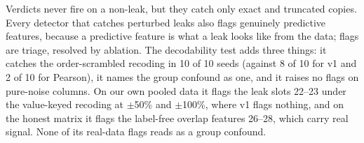 \documentclass{article}
\begin{document}
Verdicts never fire on a non-leak, but they catch only exact and truncated copies. Every detector
that catches perturbed leaks also flags genuinely predictive features, because a predictive
feature is what a leak looks like from the data; flags are triage, resolved by ablation. The
decodability test adds three things: it catches the order-scrambled recoding in 10 of 10 seeds
(against 8 of 10 for v1 and 2 of 10 for Pearson), it names the group confound as one, and it raises
no flags on pure-noise columns. On our own pooled data it flags the leak slots 22--23 under the
value-keyed recoding at $\pm$50\% and $\pm$100\%, where v1 flags nothing, and on the honest matrix it
flags the label-free overlap features 26--28, which carry real signal. None of its real-data flags
reads as a group confound.



\end{document}
